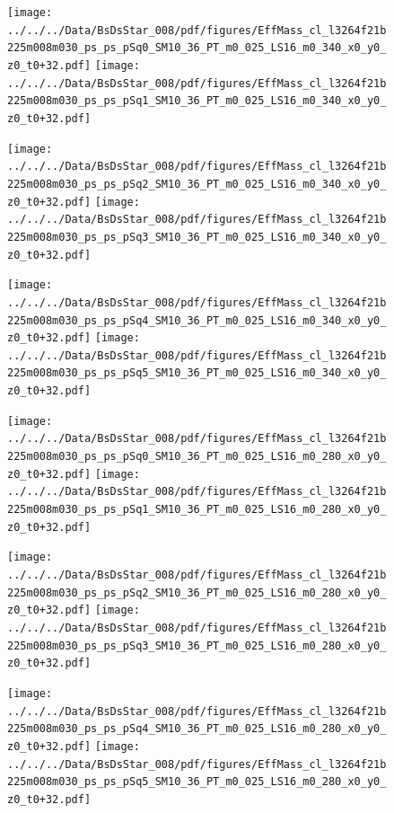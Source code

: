 \documentclass[a4paper,10pt]{article}
\begin{document}
\begin{figure}[p]
 \texttt{[image: ../../../Data/BsDsStar\_008/pdf/figures/EffMass\_cl\_l3264f21b225m008m030\_ps\_ps\_pSq0\_SM10\_36\_PT\_m0\_025\_LS16\_m0\_340\_x0\_y0\_z0\_t0+32.pdf]} 
 \texttt{[image: ../../../Data/BsDsStar\_008/pdf/figures/EffMass\_cl\_l3264f21b225m008m030\_ps\_ps\_pSq1\_SM10\_36\_PT\_m0\_025\_LS16\_m0\_340\_x0\_y0\_z0\_t0+32.pdf]} 
 \end{figure}
\begin{figure}[p]
 \texttt{[image: ../../../Data/BsDsStar\_008/pdf/figures/EffMass\_cl\_l3264f21b225m008m030\_ps\_ps\_pSq2\_SM10\_36\_PT\_m0\_025\_LS16\_m0\_340\_x0\_y0\_z0\_t0+32.pdf]} 
 \texttt{[image: ../../../Data/BsDsStar\_008/pdf/figures/EffMass\_cl\_l3264f21b225m008m030\_ps\_ps\_pSq3\_SM10\_36\_PT\_m0\_025\_LS16\_m0\_340\_x0\_y0\_z0\_t0+32.pdf]} 
 \end{figure}
\begin{figure}[p]
 \texttt{[image: ../../../Data/BsDsStar\_008/pdf/figures/EffMass\_cl\_l3264f21b225m008m030\_ps\_ps\_pSq4\_SM10\_36\_PT\_m0\_025\_LS16\_m0\_340\_x0\_y0\_z0\_t0+32.pdf]} 
 \texttt{[image: ../../../Data/BsDsStar\_008/pdf/figures/EffMass\_cl\_l3264f21b225m008m030\_ps\_ps\_pSq5\_SM10\_36\_PT\_m0\_025\_LS16\_m0\_340\_x0\_y0\_z0\_t0+32.pdf]} 
 \end{figure}
\clearpage
\begin{figure}[p]
 \texttt{[image: ../../../Data/BsDsStar\_008/pdf/figures/EffMass\_cl\_l3264f21b225m008m030\_ps\_ps\_pSq0\_SM10\_36\_PT\_m0\_025\_LS16\_m0\_280\_x0\_y0\_z0\_t0+32.pdf]} 
 \texttt{[image: ../../../Data/BsDsStar\_008/pdf/figures/EffMass\_cl\_l3264f21b225m008m030\_ps\_ps\_pSq1\_SM10\_36\_PT\_m0\_025\_LS16\_m0\_280\_x0\_y0\_z0\_t0+32.pdf]} 
 \end{figure}
\begin{figure}[p]
 \texttt{[image: ../../../Data/BsDsStar\_008/pdf/figures/EffMass\_cl\_l3264f21b225m008m030\_ps\_ps\_pSq2\_SM10\_36\_PT\_m0\_025\_LS16\_m0\_280\_x0\_y0\_z0\_t0+32.pdf]} 
 \texttt{[image: ../../../Data/BsDsStar\_008/pdf/figures/EffMass\_cl\_l3264f21b225m008m030\_ps\_ps\_pSq3\_SM10\_36\_PT\_m0\_025\_LS16\_m0\_280\_x0\_y0\_z0\_t0+32.pdf]} 
 \end{figure}
\begin{figure}[p]
 \texttt{[image: ../../../Data/BsDsStar\_008/pdf/figures/EffMass\_cl\_l3264f21b225m008m030\_ps\_ps\_pSq4\_SM10\_36\_PT\_m0\_025\_LS16\_m0\_280\_x0\_y0\_z0\_t0+32.pdf]} 
 \texttt{[image: ../../../Data/BsDsStar\_008/pdf/figures/EffMass\_cl\_l3264f21b225m008m030\_ps\_ps\_pSq5\_SM10\_36\_PT\_m0\_025\_LS16\_m0\_280\_x0\_y0\_z0\_t0+32.pdf]} 
 \end{figure}
\clearpage
\clearpage
\end{document}
